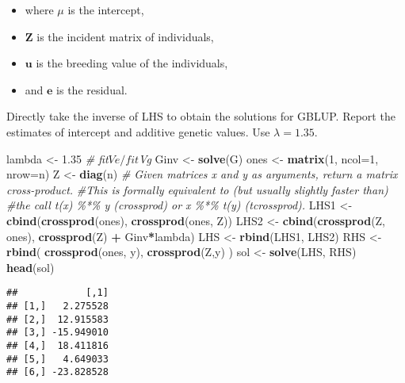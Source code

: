 \documentclass[
]{article}
\newenvironment{Shaded}{\begin{snugshade}}{\end{snugshade}}
\newcommand{\AttributeTok}[1]{\textcolor[rgb]{0.13,0.29,0.53}{#1}}
\newcommand{\CommentTok}[1]{\textcolor[rgb]{0.56,0.35,0.01}{\textit{#1}}}
\newcommand{\DecValTok}[1]{\textcolor[rgb]{0.00,0.00,0.81}{#1}}
\newcommand{\FloatTok}[1]{\textcolor[rgb]{0.00,0.00,0.81}{#1}}
\newcommand{\FunctionTok}[1]{\textcolor[rgb]{0.13,0.29,0.53}{\textbf{#1}}}
\newcommand{\NormalTok}[1]{#1}
\newcommand{\OtherTok}[1]{\textcolor[rgb]{0.56,0.35,0.01}{#1}}
\newcommand{\SpecialCharTok}[1]{\textcolor[rgb]{0.81,0.36,0.00}{\textbf{#1}}}
\providecommand{\tightlist}{%
  \setlength{\itemsep}{0pt}\setlength{\parskip}{0pt}}
\begin{document}
\begin{itemize}
\tightlist
\item
  where \(\mu\) is the intercept,
\item
  \(\mathbf{Z}\) is the incident matrix of individuals,
\item
  \(\mathbf{u}\) is the breeding value of the individuals,
\item
  and \(\mathbf{e}\) is the residual.
\end{itemize}

Directly take the inverse of LHS to obtain the solutions for GBLUP.
Report the estimates of intercept and additive genetic values. Use
\(\lambda = 1.35\).

\begin{Shaded}
\begin{Highlighting}[]
\NormalTok{lambda }\OtherTok{\textless{}{-}} \FloatTok{1.35} \CommentTok{\# fit$Ve / fit$Vg}
\NormalTok{Ginv }\OtherTok{\textless{}{-}} \FunctionTok{solve}\NormalTok{(G)}
\NormalTok{ones }\OtherTok{\textless{}{-}} \FunctionTok{matrix}\NormalTok{(}\DecValTok{1}\NormalTok{, }\AttributeTok{ncol=}\DecValTok{1}\NormalTok{, }\AttributeTok{nrow=}\NormalTok{n)}
\NormalTok{Z }\OtherTok{\textless{}{-}} \FunctionTok{diag}\NormalTok{(n)}
\CommentTok{\# Given matrices x and y as arguments, return a matrix cross{-}product. }
\CommentTok{\#This is formally equivalent to (but usually slightly faster than) }
\CommentTok{\#the call t(x) \%*\% y (crossprod) or x \%*\% t(y) (tcrossprod).}
\NormalTok{LHS1 }\OtherTok{\textless{}{-}} \FunctionTok{cbind}\NormalTok{(}\FunctionTok{crossprod}\NormalTok{(ones), }\FunctionTok{crossprod}\NormalTok{(ones, Z)) }
\NormalTok{LHS2 }\OtherTok{\textless{}{-}} \FunctionTok{cbind}\NormalTok{(}\FunctionTok{crossprod}\NormalTok{(Z, ones), }\FunctionTok{crossprod}\NormalTok{(Z) }\SpecialCharTok{+}\NormalTok{  Ginv}\SpecialCharTok{*}\NormalTok{lambda)}
\NormalTok{LHS }\OtherTok{\textless{}{-}} \FunctionTok{rbind}\NormalTok{(LHS1, LHS2)}
\NormalTok{RHS }\OtherTok{\textless{}{-}} \FunctionTok{rbind}\NormalTok{( }\FunctionTok{crossprod}\NormalTok{(ones, y), }\FunctionTok{crossprod}\NormalTok{(Z,y) )}
\NormalTok{sol }\OtherTok{\textless{}{-}} \FunctionTok{solve}\NormalTok{(LHS, RHS)}
\FunctionTok{head}\NormalTok{(sol)}
\end{Highlighting}
\end{Shaded}

\begin{verbatim}
##            [,1]
## [1,]   2.275528
## [2,]  12.915583
## [3,] -15.949010
## [4,]  18.411816
## [5,]   4.649033
## [6,] -23.828528
\end{verbatim}
\end{document}
